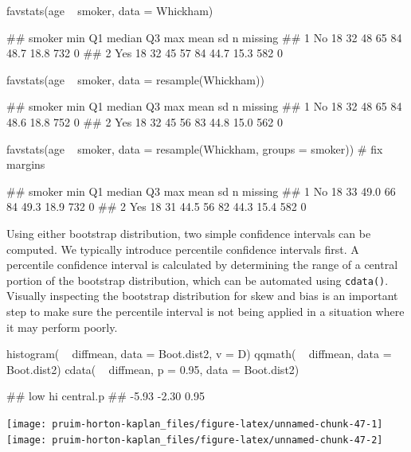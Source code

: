 \begin{Schunk}
\begin{Sinput}
favstats(age ~ smoker, data = Whickham)
\end{Sinput}
\begin{Soutput}
##   smoker min Q1 median Q3 max mean   sd   n missing
## 1     No  18 32     48 65  84 48.7 18.8 732       0
## 2    Yes  18 32     45 57  84 44.7 15.3 582       0
\end{Soutput}
\begin{Sinput}
favstats(age ~ smoker, data = resample(Whickham))
\end{Sinput}
\begin{Soutput}
##   smoker min Q1 median Q3 max mean   sd   n missing
## 1     No  18 32     48 65  84 48.6 18.8 752       0
## 2    Yes  18 32     45 56  83 44.8 15.0 562       0
\end{Soutput}
\begin{Sinput}
favstats(age ~ smoker, data = resample(Whickham, groups = smoker))  # fix margins
\end{Sinput}
\begin{Soutput}
##   smoker min Q1 median Q3 max mean   sd   n missing
## 1     No  18 33   49.0 66  84 49.3 18.9 732       0
## 2    Yes  18 31   44.5 56  82 44.3 15.4 582       0
\end{Soutput}
\end{Schunk}

Using either bootstrap distribution, two simple confidence intervals can
be computed. We typically introduce percentile confidence intervals
first. A percentile confidence interval is calculated by determining the
range of a central portion of the bootstrap distribution, which can be
automated using \texttt{cdata()}. Visually inspecting the bootstrap
distribution for skew and bias is an important step to make sure the
percentile interval is not being applied in a situation where it may
perform poorly.

\begin{Schunk}
\begin{Sinput}
histogram( ~ diffmean, data = Boot.dist2, v = D)
qqmath( ~ diffmean, data = Boot.dist2)
cdata( ~ diffmean, p = 0.95, data = Boot.dist2)
\end{Sinput}
\begin{Soutput}
##       low        hi central.p 
##     -5.93     -2.30      0.95
\end{Soutput}


\begin{center}\texttt{[image: pruim-horton-kaplan\_files/figure-latex/unnamed-chunk-47-1]} \texttt{[image: pruim-horton-kaplan\_files/figure-latex/unnamed-chunk-47-2]} \end{center}

\end{Schunk}

